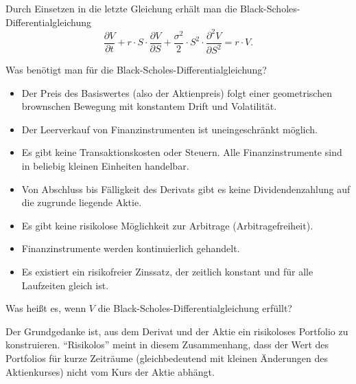 \begin{QandA}
\begin{answered}
        Durch Einsetzen in die letzte Gleichung erhält man die Black-Scholes-Differentialgleichung
        \[
            \frac{\partial V}{\partial t}+r \cdot S \cdot \frac{\partial V}{\partial S} + {\frac{\sigma^{2}}{2}} \cdot S^{2} \cdot \frac{\partial ^{2}V}{\partial S^{2}} = r \cdot V.
        \]
    \end{answered}

    \item Was benötigt man für die Black-Scholes-Differentialgleichung?
    \begin{answered}
        \begin{itemize}
            \item Der Preis des Basiswertes (also der Aktienpreis) folgt einer geometrischen brownschen Bewegung mit konstantem Drift und Volatilität.
            \item Der Leerverkauf von Finanzinstrumenten ist uneingeschränkt möglich.
            \item Es gibt keine Transaktionskosten oder Steuern. Alle Finanzinstrumente sind in beliebig kleinen Einheiten handelbar.
            \item Von Abschluss bis Fälligkeit des Derivats gibt es keine Dividendenzahlung auf die zugrunde liegende Aktie.
            \item Es gibt keine risikolose Möglichkeit zur Arbitrage (Arbitragefreiheit).
            \item Finanzinstrumente werden kontinuierlich gehandelt.
            \item Es existiert ein risikofreier Zinssatz, der zeitlich konstant und für alle Laufzeiten gleich ist.
        \end{itemize}
    \end{answered}

    \item Was heißt es, wenn $V$ die Black-Scholes-Differentialgleichung erfüllt?
    \begin{answered}
        Der Grundgedanke ist, aus dem Derivat und der Aktie ein risikoloses Portfolio zu konstruieren.
        \enquote{Risikolos} meint in diesem Zusammenhang, dass der Wert des Portfolios für kurze Zeiträume (gleichbedeutend mit kleinen Änderungen des Aktienkurses) nicht vom Kurs der Aktie abhängt.
    \end{answered}


\end{QandA}
